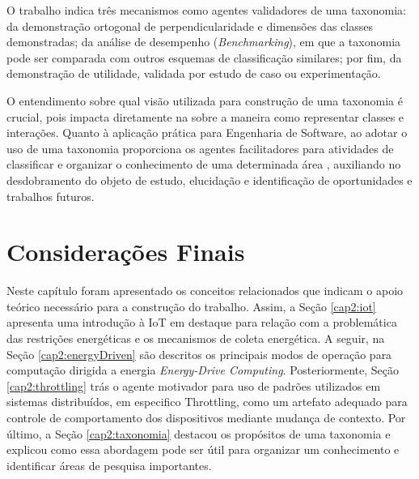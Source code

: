 O trabalho \cite{smite_empirically_2014} indica três mecanismos como agentes validadores de uma taxonomia: da demonstração ortogonal de perpendicularidade e dimensões das classes demonstradas; da análise de desempenho (\textit{Benchmarking}), em que a taxonomia pode ser comparada com outros esquemas de classificação similares; por fim, da demonstração de utilidade, validada por estudo de caso ou experimentação.

O entendimento sobre qual visão utilizada para construção de uma taxonomia é crucial, pois impacta diretamente na sobre a maneira como representar classes e interações. Quanto à aplicação prática para Engenharia de Software, ao adotar o uso de uma taxonomia proporciona os agentes facilitadores para atividades de classificar e organizar o conhecimento de uma determinada área \cite{usman_taxonomies_2017}, auxiliando no desdobramento do objeto de estudo, elucidação e identificação de oportunidades e trabalhos futuros.

\section{Considerações Finais}
 \label{cap2:consideracoesFinais}
 
 Neste capítulo foram apresentado os conceitos relacionados que indicam o apoio teórico necessário para a construção do trabalho. Assim, a Seção \ref{cap2:iot} apresenta uma introdução à IoT em destaque para relação com a problemática das restrições energéticas e os mecanismos de coleta energética. A seguir, na Seção \ref{cap2:energyDriven} são descritos os principais modos de operação para computação dirigida a energia \textit{Energy-Drive Computing}. Posteriormente, Seção \ref{cap2:throttling} trás o agente motivador para uso de padrões utilizados em sistemas distribuídos, em especifico Throttling, como um artefato adequado para controle de comportamento dos dispositivos mediante mudança de contexto. Por último, a Seção \ref{cap2:taxonomia} destacou os propósitos de uma taxonomia e explicou como essa abordagem pode ser útil para organizar um conhecimento e identificar áreas de pesquisa importantes.
